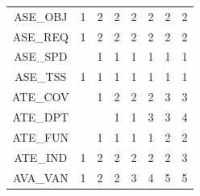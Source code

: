 \begin{table}[]
\begin{tabular}{|c|c|c|c|c|c|c|c|}
ASE\_OBJ                & 1     & 2     & 2    & 2    & 2    & 2    & 2    \\ 
ASE\_REQ                & 1     & 2     & 2    & 2    & 2    & 2    & 2    \\ 
ASE\_SPD                &       & 1     & 1    & 1    & 1    & 1    & 1    \\ 
ASE\_TSS                & 1     & 1     & 1    & 1    & 1    & 1    & 1    \\ 
\midrule
ATE\_COV                &       & 1     & 2    & 2    & 2    & 3    & 3    \\ 
ATE\_DPT                &       &       & 1    & 1    & 3    & 3    & 4    \\ 
ATE\_FUN                &       & 1     & 1    & 1    & 1    & 2    & 2    \\ 
ATE\_IND                & 1     & 2     & 2    & 2    & 2    & 2    & 3    \\ 
\midrule
AVA\_VAN                & 1     & 2     & 2    & 3    & 4    & 5    & 5    \\ \hline
\end{tabular}
\end{table}

